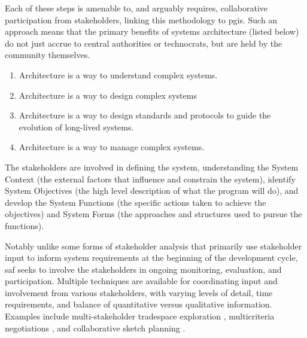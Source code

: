 Each of these steps is amenable to, and arguably requires, collaborative participation from stakeholders, linking this methodology to \ac{pgis}. Such an approach means that the primary benefits of systems architecture (listed below) \cite{crawley2004} do not just accrue to central authorities or technocrats, but are held by the community themselves.

\begin{enumerate}[itemsep=0pt,parsep=0pt]
	\item{Architecture is a way to understand complex systems.}
	\item{Architecture is a way to design complex systems}
	\item{Architecture is a way to design standards and protocols to guide the evolution of long-lived systems.}
	\item{Architecture is a way to manage complex systems.}
\end{enumerate}

The stakeholders are involved in defining the system, understanding the System Context (the external factors that influence and constrain the system), identify System Objectives (the high level description of what the program will do), and develop the System Functions (the specific actions taken to achieve the objectives) and System Forms (the approaches and structures used to pursue the functions). 

Notably unlike some forms of stakeholder analysis that primarily use stakeholder input to inform system requirements at the beginning of the development cycle, \ac{saf} seeks to involve the stakeholders in ongoing monitoring, evaluation, and participation. Multiple techniques are available for coordinating input and involvement from various stakeholders, with varying levels of detail, time requirements, and balance of quantitative versus qualitative information. Examples include multi-stakeholder tradespace exploration \cite{fitzgeraldRecommendationsFramingMultistakeholder2016}, multicriteria negotiations \cite{sparrevikUseMulticriteriaInvolvement2011}, and collaborative sketch planning \cite{vonkSociotechnicalPSSDevelopment2010}.


\subsection{} 

